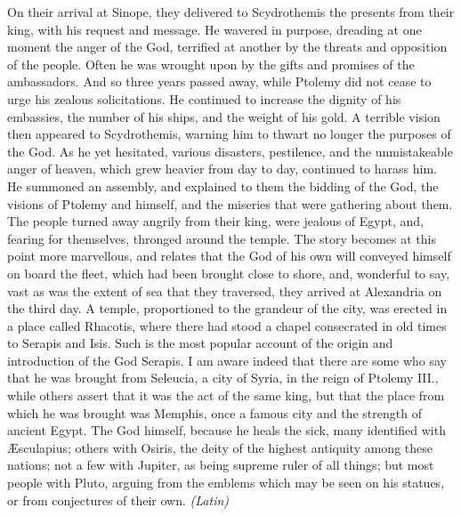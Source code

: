On their arrival at Sinope, they delivered to Scydrothemis the presents from their king, with his request and message. He wavered in purpose, dreading at one moment the anger of the God, terrified at another by the threats and opposition of the people. Often he was wrought upon by the gifts and promises of the ambassadors. And so three years passed away, while Ptolemy did not cease to urge his zealous solicitations. He continued to increase the dignity of his embassies, the number of his ships, and the weight of his gold. A terrible vision then appeared to Scydrothemis, warning him to thwart no longer the purposes of the God. As he yet hesitated, various disasters, pestilence, and the unmistakeable anger of heaven, which grew heavier from day to day, continued to harass him. He summoned an assembly, and explained to them the bidding of the God, the visions of Ptolemy and himself, and the miseries that were gathering about them. The people turned away angrily from their king, were jealous of Egypt, and, fearing for themselves, thronged around the temple. The story becomes at this point more marvellous, and relates that the God of his own will conveyed himself on board the fleet, which had been brought close to shore, and, wonderful to say, vast as was the extent of sea that they traversed, they arrived at Alexandria on the third day. A temple, proportioned to the grandeur of the city, was erected in a place called Rhacotis, where there had stood a chapel consecrated in old times to Serapis and Isis. Such is the most popular account of the origin and introduction of the God Serapis. I am aware indeed that there are some who say that he was brought from Seleucia, a city of Syria, in the reign of Ptolemy III., while others assert that it was the act of the same king, but that the place from which he was brought was Memphis, once a famous city and the strength of ancient Egypt. The God himself, because he heals the sick, many identified with Æsculapius; others with Osiris, the deity of the highest antiquity among these nations; not a few with Jupiter, as being supreme ruler of all things; but most people with Pluto, arguing from the emblems which may be seen on his statues, or from conjectures of their own. \emph{(Latin)}


